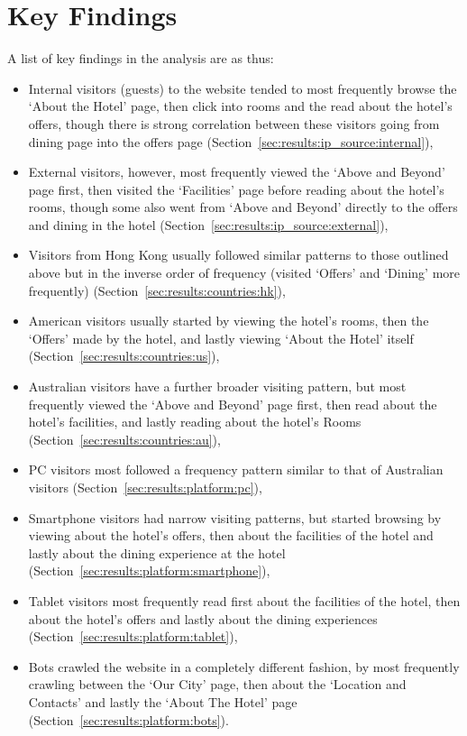 \section{Key Findings}
\label{sec:key_findings}

A list of key findings in the analysis are as thus:

\begin{itemize}
  \item Internal visitors (guests) to the website tended to most frequently browse the `About the Hotel' page, then click into rooms and the read about the hotel's offers, though there is strong correlation between these visitors going from dining page into the offers page (Section~\ref{sec:results:ip_source:internal}),
  \item External visitors, however, most frequently viewed the `Above and Beyond' page first, then visited the `Facilities' page before reading about the hotel's rooms, though some also went from `Above and Beyond' directly to the offers and dining in the hotel (Section~\ref{sec:results:ip_source:external}),
  \item Visitors from Hong Kong usually followed similar patterns to those outlined above but in the inverse order of frequency (visited `Offers' and `Dining' more frequently) (Section~\ref{sec:results:countries:hk}),
  \item American visitors usually started by viewing the hotel's rooms, then the `Offers' made by the hotel, and lastly viewing `About the Hotel' itself (Section~\ref{sec:results:countries:us}),
  \item Australian visitors have a further broader visiting pattern, but most frequently viewed the `Above and Beyond' page first, then read about the hotel's facilities, and lastly reading about the hotel's Rooms (Section~\ref{sec:results:countries:au}),
  \item PC visitors most followed a frequency pattern similar to that of Australian visitors (Section~\ref{sec:results:platform:pc}),
  \item Smartphone visitors had narrow visiting patterns, but started browsing by viewing about the hotel's offers, then about the facilities of the hotel and lastly about the dining experience at the hotel (Section~\ref{sec:results:platform:smartphone}),
  \item Tablet visitors most frequently read first about the facilities of the hotel, then about the hotel's offers and lastly about the dining experiences (Section~\ref{sec:results:platform:tablet}),
  \item Bots crawled the website in a completely different fashion, by most frequently crawling between the `Our City' page, then about the `Location and Contacts' and lastly the `About The Hotel' page (Section~\ref{sec:results:platform:bots}). 
\end{itemize}